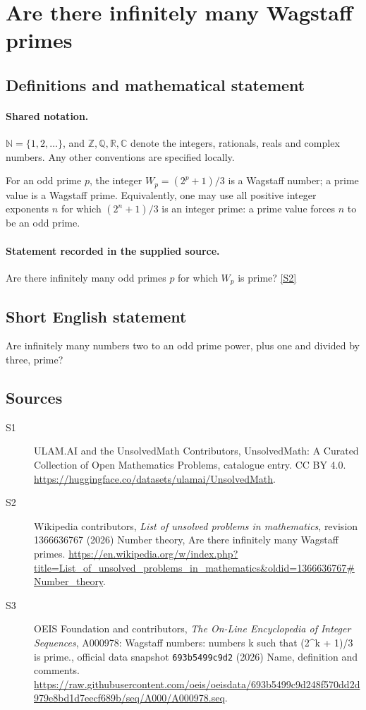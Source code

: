 \documentclass[11pt]{article}
\newcommand{\sref}[2]{\hyperlink{source:#1:#2}{[S#2]}}
\begin{document}
\section{Are there infinitely many Wagstaff primes}\label{statement}

\subsection{Definitions and mathematical statement}

\paragraph{Shared notation.}$\mathbb N=\{1,2,\ldots\}$, and $\mathbb Z,\mathbb Q,\mathbb R,\mathbb C$ denote the integers, rationals, reals and complex numbers. Any other conventions are specified locally.


For an odd prime $p$, the integer $W_p=(2^p+1)/3$ is a Wagstaff number; a prime value is a Wagstaff prime. Equivalently, one may use all positive integer exponents $n$ for which $(2^n+1)/3$ is an integer prime: a prime value forces $n$ to be an odd prime.
\paragraph{Statement recorded in the supplied source.}
Are there infinitely many odd primes $p$ for which $W_p$ is prime? \sref{statement}{2}
\subsection{Short English statement}
Are infinitely many numbers two to an odd prime power, plus one and divided by three, prime?
\subsection{Sources}
\begin{description}
\item[\hypertarget{source:statement:1}{S1}] ULAM.AI and the UnsolvedMath Contributors, UnsolvedMath: A Curated Collection of Open Mathematics Problems, catalogue entry. CC BY 4.0. \url{https://huggingface.co/datasets/ulamai/UnsolvedMath}.
\item[\hypertarget{source:statement:2}{S2}] Wikipedia contributors, \emph{List of unsolved problems in mathematics}, revision 1366636767 (2026) Number theory, Are there infinitely many Wagstaff primes. \url{https://en.wikipedia.org/w/index.php?title=List_of_unsolved_problems_in_mathematics&oldid=1366636767#Number_theory}.
\item[\hypertarget{source:statement:3}{S3}] OEIS Foundation and contributors, \emph{The On-Line Encyclopedia of Integer Sequences}, A000978: Wagstaff numbers: numbers k such that (2\textasciicircum{}k + 1)/3 is prime., official data snapshot \texttt{693b5499c9d2} (2026) Name, definition and comments. \url{https://raw.githubusercontent.com/oeis/oeisdata/693b5499c9d248f570dd2d979e8bd1d7eecf689b/seq/A000/A000978.seq}.
\end{description}
\label{end:statement}
\end{document}
